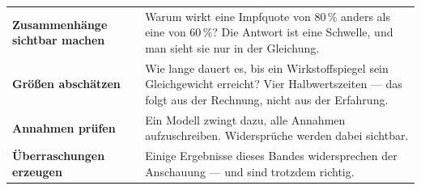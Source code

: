 \begin{merksatz}
\begin{center}
{\small
\renewcommand{\arraystretch}{1.55}
\begin{tabular}{@{}P{3.0cm}P{5.6cm}@{}}
\toprule
\textbf{Zusammen\-hänge sichtbar machen} & Warum wirkt eine Impfquote von $80\,\%$ anders als eine von $60\,\%$? Die Antwort ist eine Schwelle, und man sieht sie nur in der Gleichung.\\
\textbf{Größen abschätzen} & Wie lange dauert es, bis ein Wirkstoffspiegel sein Gleichgewicht erreicht? Vier Halbwertszeiten --- das folgt aus der Rechnung, nicht aus der Erfahrung.\\
\textbf{Annahmen prüfen} & Ein Modell zwingt dazu, alle Annahmen aufzuschreiben. Widersprüche werden dabei sichtbar.\\
\textbf{Überraschungen erzeugen} & Einige Ergebnisse dieses Bandes widersprechen der Anschauung --- und sind trotzdem richtig.\\
\bottomrule
\end{tabular}}
\end{center}

\begin{center}
\begin{minipage}{0.88\textwidth}
\end{minipage}
\end{center}
\end{merksatz}

